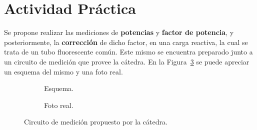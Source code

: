   \pagebreak
  \section{Actividad Práctica}
    Se propone realizar las mediciones de \textbf{potencias} y \textbf{factor de potencia}, y posteriormente,
    la \textbf{corrección} de dicho factor, en una carga reactiva, la cual se trata de un tubo fluorescente 
    común. Este mismo se encuentra preparado junto a un circuito de medición que provee la cátedra. En la 
    Figura~\ref{fig:CircuitoMedicion} se puede apreciar un esquema del mismo y una foto real.

    \begin{figure}[H]
      \centering
        \begin{subfigure}[t]{0.7\textwidth}
          \centering
          \caption{Esquema.}
          \label{fig:EsquemaCircuito}
        \end{subfigure}
        \begin{subfigure}[t]{0.7\textwidth}
          \centering
          \caption{Foto real.}
          \label{fig:FotoRealCircuito}
        \end{subfigure}
      \caption{Circuito de medición propuesto por la cátedra.}
      \label{fig:CircuitoMedicion}
    \end{figure}

